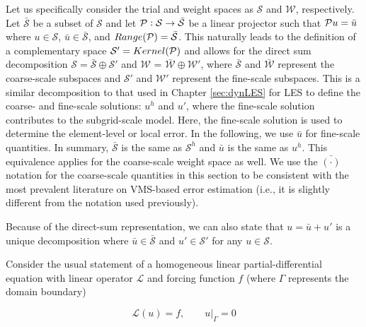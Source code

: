 Let us specifically consider the trial and weight spaces as $\mathcal{S}$ and $\mathcal{W}$, respectively.
Let $\bar{\mathcal{S}}$ be a subset of $\mathcal{S}$ and let $\mathcal{P}: \mathcal{S} \rightarrow \bar{\mathcal{S}}$ be a linear projector such that $\mathcal{P} u = \bar{u}$ where $u \in \mathcal{S}$, $\bar{u} \in \bar{\mathcal{S}}$, and $Range(\mathcal{P})=\bar{\mathcal{S}}$.
This naturally leads to the definition of a complementary space $\mathcal{S}' = Kernel(\mathcal{P})$ and allows for the direct sum decomposition $\mathcal{S} = \bar{\mathcal{S}} \oplus \mathcal{S}'$ and $\mathcal{W}$ = $\bar{\mathcal{W}} \oplus \mathcal{W}'$, where $\bar{\mathcal{S}}$ and $\bar{\mathcal{W}}$ represent the coarse-scale subspaces and $\mathcal{S}'$ and $\mathcal{W}'$ represent the fine-scale subspaces. This is a similar decomposition to that used in Chapter \ref{sec:dynLES} for LES to define the coarse- and fine-scale solutions: $u^h$ and $u'$, where the fine-scale solution contributes to the subgrid-scale model.
Here, the fine-scale solution is used to determine the element-level or local error. In the following, we use $\bar{u}$ for fine-scale quantities. In summary, $\bar{\mathcal{S}}$ is the same as $\mathcal{S}^h$ and $\bar{u}$ is the same as $u^h$. This equivalence applies for the coarse-scale weight space as well. 
We use the $\bar{(\cdot)}$ notation for the coarse-scale quantities in this section to be consistent with the most prevalent literature on VMS-based error estimation (i.e., it is slightly different from the notation used previously).

Because of the direct-sum representation, we can also state that $u=\bar{u}+u'$ is a unique decomposition where $\bar{u} \in \bar{\mathcal{S}}$ and $u' \in \mathcal{S}'$ for any $u \in \mathcal{S}$.


Consider the usual statement of a homogeneous linear partial-differential equation with linear operator $\mathcal{L}$ and forcing function $f$ (where $\Gamma$ represents the domain boundary)

\begin{equation}
    \mathcal{L}(u) = f, \qquad u|_{\Gamma} = 0
    \label{eq:modelProblem}
\end{equation} 

